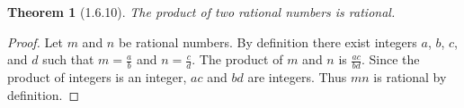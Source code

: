 \documentclass[a4paper, 12pt]{article}
\theoremstyle{plain}
\newtheorem*{theorem*}{Theorem}
\begin{document}
	
	\begin{theorem*}[1.6.10]
		The product of two rational numbers is rational.
	\end{theorem*}
	
	\begin{proof}
		Let $m$ and $n$ be rational numbers. By definition there exist integers $a$, $b$, $c$, and $d$ such that $m = \frac{a}{b}$ and $n = \frac{c}{d}$. The product of $m$ and $n$ is $\frac{ac}{bd}$. Since the product of integers is an integer, $ac$ and $bd$ are integers. Thus $mn$ is rational by definition.
	\end{proof}
\end{document}
